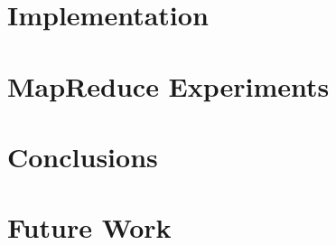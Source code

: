 \chapter{Implementation}

\chapter{MapReduce Experiments}

\chapter{Conclusions}

\chapter{Future Work}

\cleardoublepage
\appendix








